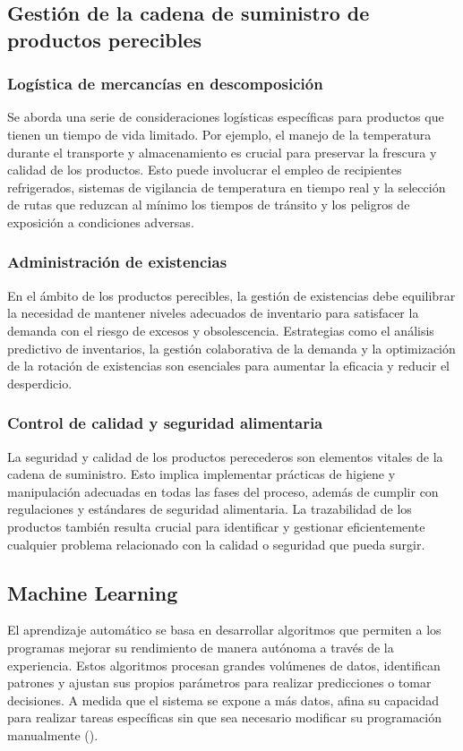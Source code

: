 \subsection{Gestión de la cadena de suministro de productos perecibles}
  
\subsubsection{Logística de mercancías en descomposición}
Se aborda una serie de consideraciones logísticas específicas para productos que tienen un tiempo de vida limitado. Por ejemplo, el manejo de la temperatura durante el transporte y almacenamiento es crucial para preservar la frescura y calidad de los productos. Esto puede involucrar el empleo de recipientes refrigerados, sistemas de vigilancia de temperatura en tiempo real y la selección de rutas que reduzcan al mínimo los tiempos de tránsito y los peligros de exposición a condiciones adversas.

\subsubsection{Administración de existencias}
En el ámbito de los productos perecibles, la gestión de existencias debe equilibrar la necesidad de mantener niveles adecuados de inventario para satisfacer la demanda con el riesgo de excesos y obsolescencia. Estrategias como el análisis predictivo de inventarios, la gestión colaborativa de la demanda y la optimización de la rotación de existencias son esenciales para aumentar la eficacia y reducir el desperdicio.

\subsubsection{Control de calidad y seguridad alimentaria}
La seguridad y calidad de los productos perecederos son elementos vitales de la cadena de suministro. Esto implica implementar prácticas de higiene y manipulación adecuadas en todas las fases del proceso, además de cumplir con regulaciones y estándares de seguridad alimentaria. La trazabilidad de los productos también resulta crucial para identificar y gestionar eficientemente cualquier problema relacionado con la calidad o seguridad que pueda surgir.

\subsection{Machine Learning}
El aprendizaje automático se basa en desarrollar algoritmos que permiten a los programas mejorar su rendimiento de manera autónoma a través de la experiencia. Estos algoritmos procesan grandes volúmenes de datos, identifican patrones y ajustan sus propios parámetros para realizar predicciones o tomar decisiones. A medida que el sistema se expone a más datos, afina su capacidad para realizar tareas específicas sin que sea necesario modificar su programación manualmente (\cite{mitchell1997machine}).

